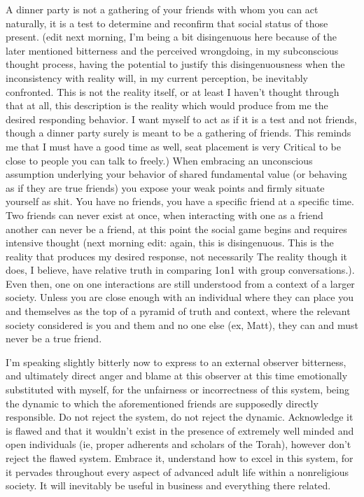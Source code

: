 A dinner party is not a gathering of your friends with whom you can act
naturally, it is a test to determine and reconfirm that social status of
those present. (edit next morning, I'm being a bit disingenuous here
because of the later mentioned bitterness and the perceived wrongdoing,
in my subconscious thought process, having the potential to justify this
disingenuousness when the inconsistency with reality will, in my current
perception, be inevitably confronted. This is not the reality itself, or
at least I haven't thought through that at all, this description is the
reality which would produce from me the desired responding behavior. I
want myself to act as if it is a test and not friends, though a dinner
party surely is meant to be a gathering of friends. This reminds me that
I must have a good time as well, seat placement is very Critical to be
close to people you can talk to freely.) When embracing an unconscious
assumption underlying your behavior of shared fundamental value (or
behaving as if they are true friends) you expose your weak points and
firmly situate yourself as shit. You have no friends, you have a
specific friend at a specific time. Two friends can never exist at once,
when interacting with one as a friend another can never be a friend, at
this point the social game begins and requires intensive thought (next
morning edit: again, this is disingenuous. This is the reality that
produces my desired response, not necessarily The reality though it
does, I believe, have relative truth in comparing 1on1 with group
conversations.). Even then, one on one interactions are still understood
from a context of a larger society. Unless you are close enough with an
individual where they can place you and themselves as the top of a
pyramid of truth and context, where the relevant society considered is
you and them and no one else (ex, Matt), they can and must never be a
true friend.

I'm speaking slightly bitterly now to express to an external observer
bitterness, and ultimately direct anger and blame at this observer at
this time emotionally substituted with myself, for the unfairness or
incorrectness of this system, being the dynamic to which the
aforementioned friends are supposedly directly responsible. Do not
reject the system, do not reject the dynamic. Acknowledge it is flawed
and that it wouldn't exist in the presence of extremely well minded and
open individuals (ie, proper adherents and scholars of the Torah),
however don't reject the flawed system. Embrace it, understand how to
excel in this system, for it pervades throughout every aspect of
advanced adult life within a nonreligious society. It will inevitably be
useful in business and everything there related.

